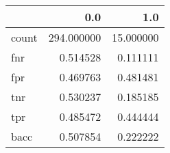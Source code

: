 \begin{tabular}{lrr}
\toprule
{} &         0.0 &        1.0 \\
\midrule
count &  294.000000 &  15.000000 \\
fnr   &    0.514528 &   0.111111 \\
fpr   &    0.469763 &   0.481481 \\
tnr   &    0.530237 &   0.185185 \\
tpr   &    0.485472 &   0.444444 \\
bacc  &    0.507854 &   0.222222 \\
\bottomrule
\end{tabular}
